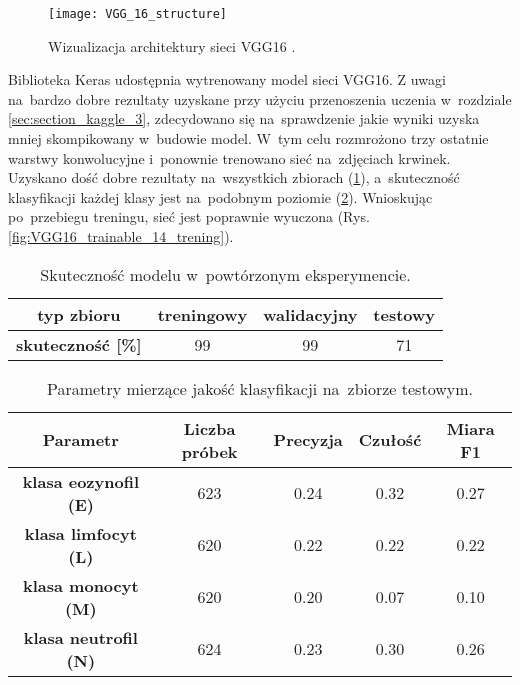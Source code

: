 \begin{figure}[h]
	\centering
	\centering
		\texttt{[image: VGG\_16\_structure]}	
	\caption{Wizualizacja architektury sieci VGG16 \cite{VGG_16_structure}.}
	\label{fig:vgg_16_stucture}
\end{figure}

{\parindent0pt
Biblioteka Keras udostępnia wytrenowany model sieci VGG16. Z uwagi na~bardzo dobre rezultaty uzyskane przy użyciu przenoszenia uczenia w~rozdziale \ref{sec:section_kaggle_3}, zdecydowano się na~sprawdzenie jakie wyniki uzyska mniej skompikowany w~budowie model. W~tym celu rozmrożono trzy ostatnie warstwy konwolucyjne i~ponownie trenowano sieć na~zdjęciach krwinek. Uzyskano dość dobre rezultaty na~wszystkich zbiorach (\ref{tab:VGG16_acc}), a~skuteczność klasyfikacji każdej klasy jest na~podobnym poziomie (\ref{tab:VGG16_params_val}). Wnioskując po~przebiegu treningu, sieć jest poprawnie wyuczona (Rys. \ref{fig:VGG16_trainable_14_trening}).

 \begin{table}[h!]
\centering
\caption[Short Heading]{Skuteczność modelu w~powtórzonym eksperymencie.}
\label{tab:VGG16_acc}
\begin{tabular}{|c|c|c|c|}
\hline
\textbf{typ zbioru}           & \textbf{treningowy} & \textbf{walidacyjny} & \textbf{testowy} \\ \hline
\textbf{skuteczność {[}\%{]}} & 99                  & 99                   & 71               \\ \hline
\end{tabular}
\end{table}

\begin{table}[h!]
\centering
\caption[Short Heading]{Parametry mierzące jakość klasyfikacji na~zbiorze testowym.}
\label{tab:VGG16_params_val}
\begin{tabular}{|c|c|c|c|c|}
\hline
\textbf{Parametr}                              & \textbf{Liczba próbek} & \textbf{Precyzja} & \textbf{Czułość} & \textbf{Miara F1}  \\ \hline
\textbf{klasa eozynofil (E)} & 623 & 0.24   & 0.32   & 0.27   \\ \hline
\textbf{klasa limfocyt (L)}  & 620 & 0.22  & 0.22 & 0.22  \\ \hline
\textbf{klasa monocyt (M)}  & 620 & 0.20   & 0.07    & 0.10  \\ \hline
\textbf{klasa neutrofil (N)}  & 624 & 0.23   & 0.30    & 0.26  \\ \hline
\end{tabular}
\end{table}

}
